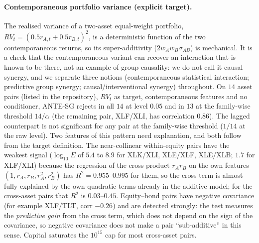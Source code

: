 \documentclass[pdflatex,sn-mathphys-ay]{sn-jnl}%
\theoremstyle{thmstyleone}%
\theoremstyle{thmstyletwo}%
\theoremstyle{thmstylethree}%
\begin{document}
\paragraph{Contemporaneous portfolio variance (explicit target).} The realised variance of a two-asset equal-weight portfolio, $RV_t=(0.5r_{A,t}+0.5r_{B,t})^2$, is a deterministic function of the
two contemporaneous returns, so its super-additivity ($2w_Aw_B\sigma_{AB}$) is mechanical. It is a check that the contemporaneous variant can recover an interaction that is known to be there, not an
example of group causality: we do not call it causal synergy, and we separate three notions (contemporaneous statistical interaction; predictive group synergy; causal/interventional synergy) throughout.
On $14$ asset pairs (listed in the repository), $RV_t$ as target, contemporaneous features and no conditioner, ANTE-SG rejects in all $14$ at level $0.05$ and in $13$ at the family-wise threshold $14/\alpha$ (the remaining pair, XLF/XLI, has correlation $0.86$).
The lagged counterpart is not significant for any pair at the family-wise threshold ($1/14$ at the raw level). Two features of this pattern need explanation, and both follow from the target definition. The near-collinear
within-equity pairs have the weakest signal ($\log_{10}E$ of $5.4$ to $8.9$ for XLK/XLI, XLE/XLF, XLE/XLB; $1.7$ for XLF/XLI) because the regression of the cross product $r_Ar_B$ on the own features $(1,r_A,r_B,r_A^2,r_B^2)$ has $R^2=0.955$--$0.995$
for them, so the cross term is almost fully explained by the own-quadratic terms already in the additive model; for the cross-asset pairs that $R^2$ is $0.03$--$0.45$. Equity--bond pairs have negative covariance (for example XLF/TLT, corr $-0.26$) and are detected strongly:
the test measures the \emph{predictive gain} from the cross term, which does not depend on the sign of the covariance, so negative covariance does not make a pair ``sub-additive'' in this sense. Capital saturates the $10^{15}$ cap for most cross-asset pairs.
\end{document}
